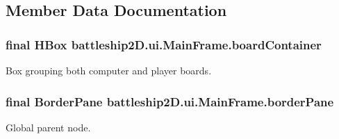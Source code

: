 \subsection{Member Data Documentation}
\hypertarget{classbattleship2D_1_1ui_1_1MainFrame_a88d90d33f8f7f63c47fdbb53328d48f7}{
\subsubsection[{board\-Container}]{\setlength{\rightskip}{0pt plus 5cm}final H\-Box battleship2\-D.\-ui.\-Main\-Frame.\-board\-Container\hspace{0.3cm}{\ttfamily [private]}}}\label{classbattleship2D_1_1ui_1_1MainFrame_a88d90d33f8f7f63c47fdbb53328d48f7}


Box grouping both computer and player boards. 

\hypertarget{classbattleship2D_1_1ui_1_1MainFrame_a3eefc62de2e2b8ae91e7c75482d6418e}{
\subsubsection[{border\-Pane}]{\setlength{\rightskip}{0pt plus 5cm}final Border\-Pane battleship2\-D.\-ui.\-Main\-Frame.\-border\-Pane\hspace{0.3cm}{\ttfamily [private]}}}\label{classbattleship2D_1_1ui_1_1MainFrame_a3eefc62de2e2b8ae91e7c75482d6418e}


Global parent node. 

